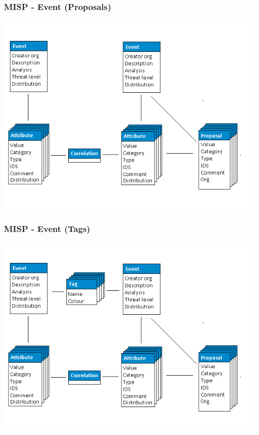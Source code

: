 \begin{frame}
    \frametitle{MISP - Event (Proposals)}
    \includegraphics[scale=0.45]{screenshots/datamodel4.png}
\end{frame}

\begin{frame}
    \frametitle{MISP - Event (Tags)}
    \includegraphics[scale=0.45]{screenshots/datamodel5.png}
\end{frame}

